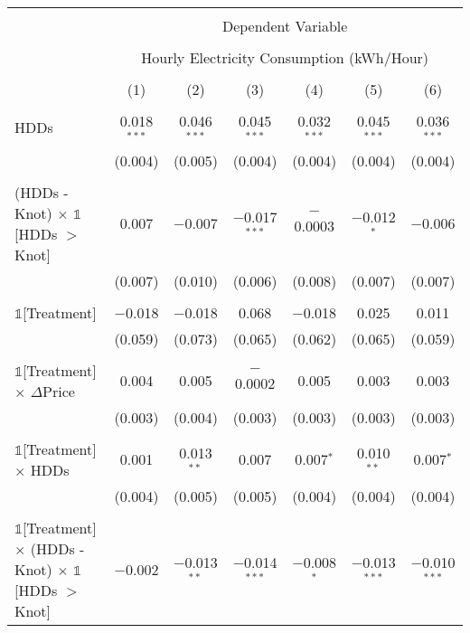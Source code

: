
\begin{table}[!htbp] \centering 
  \label{Table:Breakdown-of-Average-Treatement-Effects_As-a-Function-of-Rate-Changes_For-Different-Intervals} 
\scriptsize
\begin{longtable}{@{\extracolsep{15pt}}lcccccc} 
\\[-1.8ex]\hline 
\hline \\[-1.8ex] 
 & \multicolumn{6}{c}{Dependent Variable} \\ 
\cline{2-7} 
\\[-1.8ex] & \multicolumn{6}{c}{Hourly Electricity Consumption  (kWh/Hour)} \\ 
\\[-1.8ex] & (1) & (2) & (3) & (4) & (5) & (6)\\ 
\hline \\[-1.8ex] \endhead
 HDDs & 0.018$^{***}$ & 0.046$^{***}$ & 0.045$^{***}$ & 0.032$^{***}$ & 0.045$^{***}$ & 0.036$^{***}$ \\ 
  & (0.004) & (0.005) & (0.004) & (0.004) & (0.004) & (0.004) \\ 
  & & & & & & \\ 
 (HDDs - Knot) $\times$ $\mathbb{1}$[HDDs $>$ Knot] & 0.007 & $-$0.007 & $-$0.017$^{***}$ & $-$0.0003 & $-$0.012$^{*}$ & $-$0.006 \\ 
  & (0.007) & (0.010) & (0.006) & (0.008) & (0.007) & (0.007) \\ 
  & & & & & & \\ 
 $\mathbb{1}$[Treatment] & $-$0.018 & $-$0.018 & 0.068 & $-$0.018 & 0.025 & 0.011 \\ 
  & (0.059) & (0.073) & (0.065) & (0.062) & (0.065) & (0.059) \\ 
  & & & & & & \\ 
 $\mathbb{1}$[Treatment] $\times$ $\Delta$Price & 0.004 & 0.005 & $-$0.0002 & 0.005 & 0.003 & 0.003 \\ 
  & (0.003) & (0.004) & (0.003) & (0.003) & (0.003) & (0.003) \\ 
  & & & & & & \\ 
 $\mathbb{1}$[Treatment] $\times$ HDDs & 0.001 & 0.013$^{**}$ & 0.007 & 0.007$^{*}$ & 0.010$^{**}$ & 0.007$^{*}$ \\ 
  & (0.004) & (0.005) & (0.005) & (0.004) & (0.004) & (0.004) \\ 
  & & & & & & \\ 
 $\mathbb{1}$[Treatment] $\times$ (HDDs - Knot) $\times$ $\mathbb{1}$[HDDs $>$ Knot] & $-$0.002 & $-$0.013$^{**}$ & $-$0.014$^{***}$ & $-$0.008$^{*}$ & $-$0.013$^{***}$ & $-$0.010$^{***}$ \\ 

\end{longtable}
\end{table}
